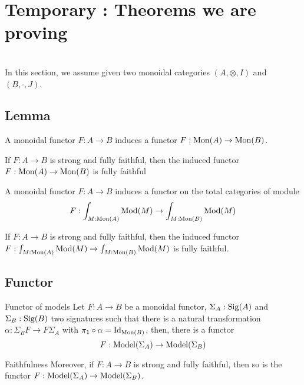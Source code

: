 \section{Temporary : Theorems we are proving }

 \\

\noindent In this section, we assume given two monoidal categories
$(A,\otimes,I)$ and $(B,\cdot,J)$.

\subsection{Lemma}

\begin{lemma}
  A monoidal functor $F : A \to B$ induces a functor $F : \operatorname{Mon}(A) \to \operatorname{Mon}(B)$.
\end{lemma}

\begin{lemma}
  If $F : A \to B$ is strong and fully faithful, then the induced functor $F
  : \operatorname{Mon}(A) \to \operatorname{Mon}(B)$ is fully faithful
\end{lemma}

\begin{lemma}
  A monoidal functor $F : A \to B$ induces a functor on the total categories
  of module
  \[ F : \int_{M:\operatorname{Mon}(A)} \operatorname{Mod}(M) \to \int_{M:\operatorname{Mon}(B)} \operatorname{Mod}(M) \]
\end{lemma}

\begin{lemma}
  If $F : A \to B$ is strong and fully faithful, then the induced functor
  $F : \int_{M:\operatorname{Mon}(A)} \operatorname{Mod}(M) \to \int_{M:\operatorname{Mon}(B)} \operatorname{Mod}(M)$ is fully faithful.
\end{lemma}

\subsection{Functor}
\begin{theorem}{Functor of models}
  \label{thm:fct-models}
  Let $F : A \to B$ be a monoidal functor, $\Sigma_A : \operatorname{Sig}(A)$ and
  $\Sigma_B : \operatorname{Sig}(B)$ two signatures such that there is a natural
  transformation $\alpha : \Sigma_B F \to F \Sigma_A$ with $\pi_1 \circ
  \alpha = \operatorname{Id}_{\operatorname{Mon}(B)}$, then, there is a functor
  \[ F : \operatorname{Model}(\Sigma_A) \to \operatorname{Model}(\Sigma_B) \]
\end{theorem}

\begin{theorem}{Faithfulness}
  Moreover, if $F : A \to B$ is strong and fully faithful, then so is the
  functor $F : \operatorname{Model}(\Sigma_A) \to \operatorname{Model}(\Sigma_B)$.
\end{theorem}

